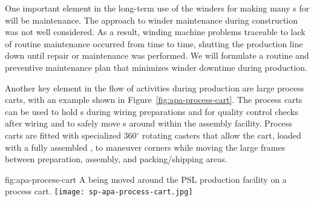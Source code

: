 One important element in the long-term use of the winders for making many s for  will be maintenance.  The approach to winder maintenance during  construction was not well considered. As a result, winding machine problems traceable to lack of routine maintenance occurred from time to time, shutting the production line down until repair or maintenance was performed. We will formulate a routine and preventive maintenance plan that minimizes winder downtime during  production.

Another key element in the flow of activities during production are large process carts, with an example shown in Figure~\ref{fig:apa-process-cart}. The process carts can be used to hold s during wiring preparations and for quality control checks after wiring and to safely move s around within the assembly facility. Process carts are fitted with specialized 360$^\circ$ rotating casters that allow the cart, loaded with a fully assembled , to maneuver corners while moving the large frames between preparation, assembly, and packing/shipping areas.

\begin{dunefigure}{fig:apa-process-cart}
{A   being moved around the PSL production facility on a process cart.}
\texttt{[image: sp-apa-process-cart.jpg]}
\end{dunefigure}

%


